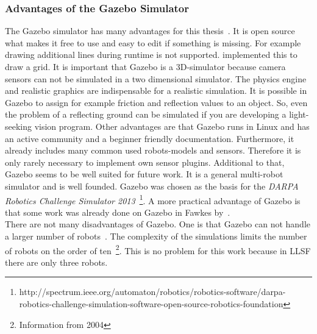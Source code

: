 \documentclass[11pt,a4paper,titlepage]{article}
\begin{document}
\subsubsection{Advantages of the Gazebo Simulator}
The Gazebo simulator has many advantages for this thesis~\cite{GazeboDesign}. It is open source what makes it free to use and easy to edit if something is missing. For example drawing additional lines during runtime is not supported. \cite{KlingenDA} implemented this to draw a grid. It is important that Gazebo is a 3D-simulator because camera sensors can not be simulated in a two dimensional simulator. The physics engine and realistic graphics are indispensable for a realistic simulation. It is possible in Gazebo to assign for example friction and reflection values to an object. So, even the problem of a reflecting ground can be simulated if you are developing a light-seeking vision program. Other advantages are that Gazebo runs in Linux and has an active community and a beginner friendly documentation. Furthermore, it already includes many common used robots-models and sensors. Therefore it is only rarely necessary to implement own sensor plugins. Additional to that, Gazebo seems to be well suited for future work. It is a general multi-robot simulator and is well founded. Gazebo was chosen as the basis for the \textit{DARPA Robotics Challenge Simulator 2013}~\footnote{http://spectrum.ieee.org/automaton/robotics/robotics-software/darpa-robotics-challenge-simulation-software-open-source-robotics-foundation}. A more practical advantage of Gazebo is that some work was already done on Gazebo in Fawkes by~\cite{KlingenDA}.\\
There are not many disadvantages of Gazebo. One is that Gazebo can not handle a larger number of robots~\cite{GazeboDesign}. The complexity of the simulations limits the number of robots on the order of ten~\footnote{Information from 2004}. This is no problem for this work because in LLSF there are only three robots.
\end{document}
